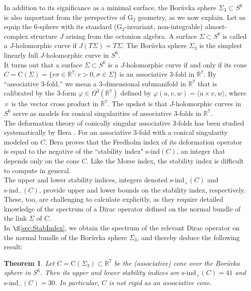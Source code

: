 \documentclass[11pt]{article}
\newcommand{\G}{\mathrm{G}}
\newcommand{\R}{\mathbb{R}}
\newtheorem{thm}{Theorem}[section]
\theoremstyle{definition}
\numberwithin{equation}{section}
\begin{document}
\indent In addition to its significance as a minimal surface, the Bor{\r{u}}vka sphere $\Sigma_3 \subset S^6$ is also important from the perspective of $\G_2$ geometry, as we now explain.  Let us equip the $6$-sphere with its standard ($\G_2$-invariant, non-integrable) almost-complex structure $J$ arising from the octonion algebra.  A surface $\Sigma \subset S^6$ is called a $J$-holomorphic curve if $J(T\Sigma) = T\Sigma$.  The Bor{\r{u}}vka sphere $\Sigma_3$ is the simplest linearly full $J$-holomorphic curve in $S^6$. \\
\indent It turns out that a surface $\Sigma \subset S^6$ is a $J$-holomorphic curve if and only if its cone $C = \mathrm{C}(\Sigma) = \{r \sigma \in \R^7 \colon r > 0, \sigma \in \Sigma\}$ is an associative $3$-fold in $\R^7$.  By ``associative $3$-fold,” we mean a $3$-dimensional submanifold in $\R^7$ that is calibrated by the $3$-form $\varphi \in \Omega^3(\R^7)$ defined by $\varphi(u,v,w) = \langle u \times v, w\rangle$, where $\times$ is the vector cross product in $\R^7$.  The upshot is that $J$-holomorphic curves in $S^6$ serve as models for conical singularities of associative $3$-folds in $\R^7$. \\
\indent The deformation theory of conically singular associative $3$-folds has been studied systematically by Bera \cite{Bera23}.  For an associative $3$-fold with a conical singularity modeled on $C$, Bera proves \cite[Theorem 1.12]{Bera23} that the Fredholm index of its deformation operator is equal to the negative of the ``stability index" $\text{s-ind}(C)$, an integer that depends only on the cone $C$.  Like the Morse index, the stability index is difficult to compute in general. \\
\indent The upper and lower stability indices, integers denoted $\text{s-ind}_+(C)$ and $\text{s-ind}_-(C)$, provide upper and lower bounds on the stability index, respectively.  These, too, are challenging to calculate explicitly, as they require detailed knowledge of the spectrum of a Dirac operator defined on the normal bundle of the link $\Sigma$ of $C$. \\
\indent In $\S$\ref{sec:StabIndex}, we obtain the spectrum of the relevant Dirac operator on the normal bundle of the Bor{\r{u}}vka sphere $\Sigma_3$, and thereby deduce the following result:


\begin{thm} \label{thm:StabilityResult} Let $C = \mathrm{C}(\Sigma_3) \subset \R^7$ be the (associative) cone over the Bor{\r{u}}vka sphere in $S^6$.  Then its upper and lower stability indices are $\mathrm{s}\text{-}\mathrm{ind}_+(C) = 41$ and $\mathrm{s}\text{-}\mathrm{ind}_-(C) = 30$.  In particular, $C$ is not rigid as an associative cone.
\end{thm}
\end{document}
